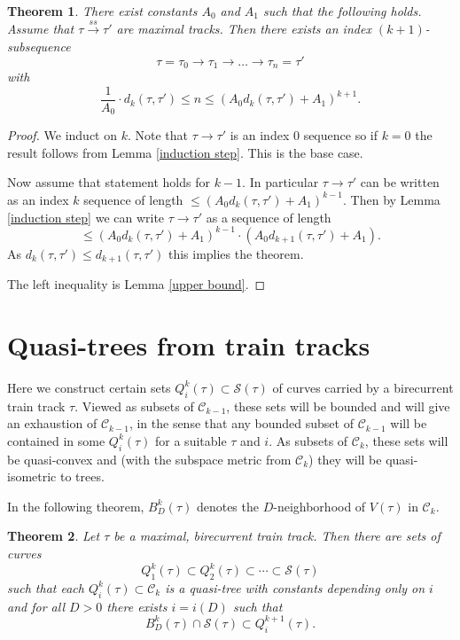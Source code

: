 \documentclass[11pt]{article}
\newtheorem{thm}{Theorem}[section]
\theoremstyle{remark}
\def\S{{\mathcal S}}
\def\C{{\mathcal C}}
\def\ss{{\overset{ss}\longrightarrow}}
\begin{document}
\begin{thm}\label{block bound}
There exist constants $A_0$ and $A_1$ such that the following holds.
  Assume that $\tau \ss \tau'$ are maximal tracks. Then there exists an index $(k+1)$-subsequence
  $$\tau=\tau_0 \to \tau_1 \to \ldots \to \tau_n=\tau'$$
with 
$$\frac1{A_0} \cdot d_k(\tau, \tau') \le n \le \left(A_0 d_{k}(\tau, \tau') + A_1\right)^{k+1}.$$
\end{thm}

\begin{proof} We induct on $k$. Note that $\tau\to\tau'$ is an index $0$ sequence so if $k=0$ the result follows from Lemma \ref{induction step}. This is the base case.

Now assume that statement holds for $k-1$. In particular $\tau\to\tau'$ can be written as an index $k$ sequence of length $\le (A_0 d_k(\tau,\tau') +A_1)^{k-1}$. Then by Lemma \ref{induction step} we can write $\tau\to \tau'$ as a sequence of length
$$\le (A_0 d_k(\tau,\tau') +A_1)^{k-1} \cdot (A_0 d_{k+1}(\tau, \tau') + A_1).$$
As $d_k(\tau, \tau') \le d_{k+1}(\tau, \tau')$ this implies the theorem.

The left inequality is Lemma \ref{upper bound}.
\end{proof}

\section{Quasi-trees from train tracks}
Here we construct certain sets $Q^k_i(\tau)\subset \S(\tau)$ of curves
carried by a birecurrent
train track $\tau$. Viewed as subsets of $\C_{k-1}$, these sets will be
bounded and will give an exhaustion of $\C_{k-1}$, in the sense that
any bounded subset of $\C_{k-1}$ will be contained in some
$Q^k_i(\tau)$ for a suitable $\tau$ and $i$. As subsets of $\C_k$,
these sets will be quasi-convex and (with the subspace metric from
$\C_k$) they will be quasi-isometric to trees.

In the following theorem, $B^k_D(\tau)$ denotes the $D$-neighborhood of $V(\tau)$
in $\C_k$.

\begin{thm}\label{exhaustion}
Let $\tau$ be a maximal, birecurrent train track. Then there are sets of curves
$$Q^k_1(\tau) \subset Q^k_2(\tau) \subset \cdots \subset \S(\tau)$$
such that each $Q^k_i(\tau)\subset \C_k$ is a quasi-tree with constants depending only on $i$ and for all $D>0$ there exists $i = i(D)$ such that
$$B^k_D(\tau) \cap \S(\tau) \subset Q^{k+1}_i(\tau).$$
\end{thm}
\end{document}
